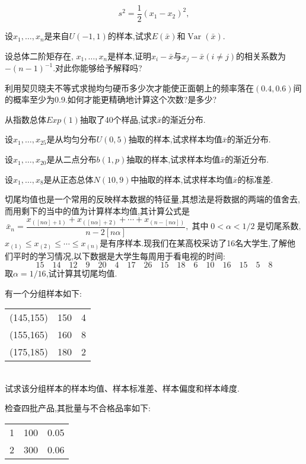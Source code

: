 \begin{xiti}
\[s^2=\frac12(x_1-x_2)^2,\]
\item 设$x_1,\dotsc,x_n$是来自$U(-1,1)$的样本,试求$E(\bar x)$和$\operatorname{Var}(\bar x)$.
\item 设总体二阶矩存在, $x_1,\dotsc,x_n$是样本,证明$x_i-\bar x$与$x_j-\bar x(i\ne j)$的相关系数为$-(n-1)^{-1}$.对此你能够给予解释吗?
\item 利用契贝晓夫不等式求抛均匀硬币多少次才能使正面朝上的频率落在$(0.4,0.6)$间的概率至少为0.9.如何才能更精确地计算这个次数?是多少?
\item 从指数总体$Exp(1)$抽取了40个样品,试求$\bar x$的渐近分布.
\item 设$x_1,\dotsc,x_{25}$是从均匀分布$U(0,5)$抽取的样本,试求样本均值$\bar x$的渐近分布.
\item 设$x_1,\dotsc,x_{20}$是从二点分布$b(1,p)$抽取的样本,试求样本均值$\bar x$的渐近分布.
\item 设$x_1,\dotsc,x_{8}$是从正态总体$N(10,9)$中抽取的样本,试求样本均值$\bar x$的标准差.
\item 切尾均值也是一个常用的反映样本数据的特征量,其想法是将数据的两端的值舍去,而用剩下的当中的值为计算样本均值,其计算公式是
\[\bar x_n=\frac{x_{([n\alpha]+1)}+x_{([n\alpha]+2)}+\dotsb+x_{(n-[n\alpha])}}{n-2[n\alpha]},
 \;\text{其中}\; 0<\alpha<1/2 \;\text{是切尾系数} ,  \]
$x_{(1)}\leq x_{(2)}\leq\dotsb\leq x_{(n)}$是有序样本.现我们在某高校采访了16名大学生,了解他们平时的学习情况,以下数据是大学生每周用于看电视的时间:
\[15\quad14\quad12\quad9\quad20\quad4\quad17\quad26\quad15\quad18\quad6\quad10\quad16
\quad15\quad5\quad8\]
取$\alpha=1/16$,试计算其切尾均值.
\item 有一个分组样本如下:\\[2mm]
\begin{tabularx}{\textwidth}{YYY}
\toprule
{}&&\\
\midrule
(145,155)&150&4\\
(155,165)&160&8\\
(175,185)&180&2\\
\bottomrule
\end{tabularx}\\[2mm]
试求该分组样本的样本均值、样本标准差、样本偏度和样本峰度.
\item 检查四批产品,其批量与不合格品率如下:\\[2mm]
\begin{tabularx}{\textwidth}{YYY}
\toprule
{}&&\\
&100&0.05\\
2&300&0.06\\

\end{tabularx}
\end{xiti}
